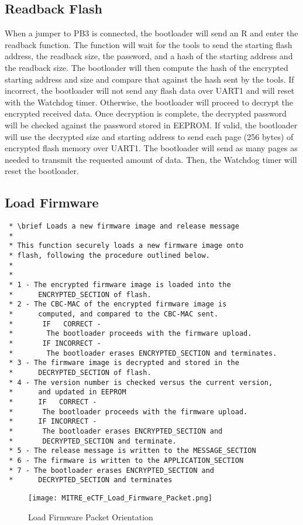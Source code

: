 \documentclass[11pt]{article}
\begin{document}
\subsection{Readback Flash}
When a jumper to PB3 is connected, the bootloader will send an R and enter the readback function.  The function will wait for the tools to send the starting flash address, the readback size, the password, and a hash of the starting address and the readback size.  The bootloader will then compute the hash of the encrypted starting address and size and compare that against the hash sent by the tools.  If incorrect, the bootloader will not send any flash data over UART1 and will reset with the Watchdog timer. Otherwise, the bootloader will proceed to decrypt the encrypted received data.  Once decryption is complete, the decrypted password will be checked against the password stored in EEPROM.  If valid, the bootloader will use the decrypted size and starting address to send each page (256 bytes) of encrypted flash memory over UART1.  The bootloader will send as many pages as needed to transmit the requested amount of data.  Then, the Watchdog timer will reset the bootloader. 
\subsection{Load Firmware}
\begin{verbatim}
 * \brief Loads a new firmware image and release message
 * 
 * This function securely loads a new firmware image onto
 * flash, following the procedure outlined below.
 * 
 * 
 * 1 - The encrypted firmware image is loaded into the 
 *      ENCRYPTED_SECTION of flash.
 * 2 - The CBC-MAC of the encrypted firmware image is 
 * 	    computed, and compared to the CBC-MAC sent.
 *	   	 IF   CORRECT - 
 *        The bootloader proceeds with the firmware upload.
 *	   	 IF INCORRECT - 
 *        The bootloader erases ENCRYPTED_SECTION and terminates.
 * 3 - The firmware image is decrypted and stored in the 
 *      DECRYPTED_SECTION of flash.
 * 4 - The version number is checked versus the current version,
 *	    and updated in EEPROM
 *		IF   CORRECT - 
 *       The bootloader proceeds with the firmware upload.
 *		IF INCORRECT - 
 *       The bootloader erases ENCRYPTED_SECTION and 
 *		 DECRYPTED_SECTION and terminate.
 * 5 - The release message is written to the MESSAGE_SECTION
 * 6 - The firmware is written to the APPLICATION_SECTION
 * 7 - The bootloader erases ENCRYPTED_SECTION and 
 *      DECRYPTED_SECTION and terminates
\end{verbatim}
\begin{figure}[!h]
\begin{center}
\texttt{[image: MITRE\_eCTF\_Load\_Firmware\_Packet.png]}
\caption{Load Firmware Packet Orientation}
\end{center}
\end{figure}
\end{document}
